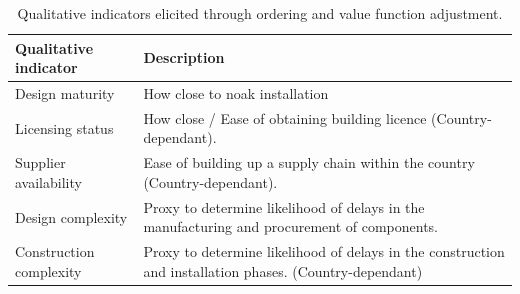 \begin{table}[!ht]
    \centering
    \caption{Qualitative indicators elicited through ordering and value function adjustment.}
    \label{eq:qi_indicators}
    \begin{tabularx}{\textwidth}{lX}
        \toprule
        \textbf{Qualitative indicator} & \textbf{Description} \\
        \midrule
        Design maturity & How close to \gls{noak} installation \\
        Licensing status & How close / Ease of obtaining building licence (Country-dependant). \\
        Supplier availability & Ease of building up a supply chain within the country (Country-dependant). \\
        Design complexity & Proxy to determine likelihood of delays in the manufacturing and procurement of components. \\
        Construction complexity & Proxy to determine likelihood of delays in the construction and installation phases. (Country-dependant) \\
        \bottomrule
    \end{tabularx}
\end{table}